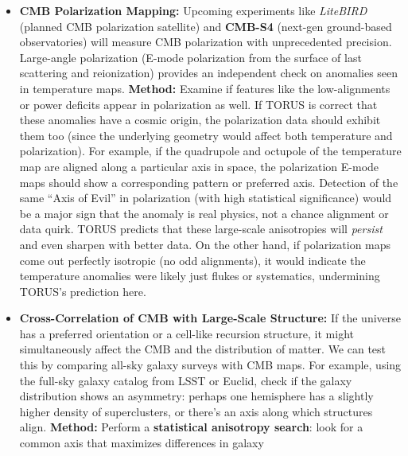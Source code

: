 \documentclass[
]{article}
\begin{document}
\begin{itemize}
  \begin{itemize}
  \item
    \textbf{CMB Polarization Mapping:} Upcoming experiments like
    \emph{LiteBIRD} (planned CMB polarization satellite) and
    \textbf{CMB-S4} (next-gen ground-based observatories) will measure
    CMB polarization with unprecedented precision. Large-angle
    polarization (E-mode polarization from the surface of last
    scattering and reionization) provides an independent check on
    anomalies seen in temperature maps\hspace{0pt}. \textbf{Method:}
    Examine if features like the low-\ell alignments or power deficits
    appear in polarization as well. If TORUS is correct that these
    anomalies have a cosmic origin, the polarization data should exhibit
    them too (since the underlying geometry would affect both
    temperature and polarization). For example, if the quadrupole and
    octupole of the temperature map are aligned along a particular axis
    in space, the polarization E-mode maps should show a corresponding
    pattern or preferred axis\hspace{0pt}. Detection of the same ``Axis
    of Evil'' in polarization (with high statistical significance) would
    be a major sign that the anomaly is real physics, not a chance
    alignment or data quirk\hspace{0pt}. TORUS predicts that these
    large-scale anisotropies will \emph{persist} and even sharpen with
    better data\hspace{0pt}. On the other hand, if polarization maps
    come out perfectly isotropic (no odd alignments), it would indicate
    the temperature anomalies were likely just flukes or systematics,
    undermining TORUS's prediction here\hspace{0pt}.
  \item
    \textbf{Cross-Correlation of CMB with Large-Scale Structure:} If the
    universe has a preferred orientation or a cell-like recursion
    structure, it might simultaneously affect the CMB and the
    distribution of matter. We can test this by comparing all-sky galaxy
    surveys with CMB maps\hspace{0pt}. For example, using the full-sky
    galaxy catalog from LSST or Euclid, check if the galaxy distribution
    shows an asymmetry: perhaps one hemisphere has a slightly higher
    density of superclusters, or there's an axis along which structures
    align. \textbf{Method:} Perform a \textbf{statistical anisotropy
    search}: look for a common axis that maximizes differences in galaxy

\end{itemize}
\end{itemize}
\end{document}
